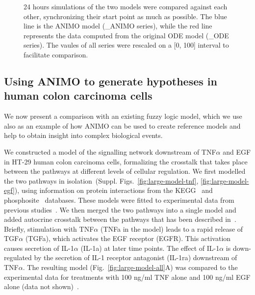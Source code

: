 \documentclass{bmcart}
\begin{document}
\begin{figure}[!htpb]
\begin{center}
\end{center}
\caption{\label{fig:grafici-drosophila-smaller} 24 hours simulations of the two models were compared
against each other, synchronizing their start point as much as possible. The blue line is the ANIMO model
({\sf \_{}ANIMO} series), while the red line represents the data computed from the original ODE model
({\sf \_{}ODE} series). The vaules of all series were rescaled on a [0, 100] interval to facilitate comparison.}
\end{figure}







\subsection*{Using ANIMO to generate hypotheses in human colon carcinoma cells}\label{subsec:case-study-larger}
We now present a comparison with an existing fuzzy logic model, which we use also as an example of how
ANIMO can be used to create reference models and help to obtain insight into complex biological events.

We constructed a model of the signalling network downstream of TNF$\alpha$ and EGF
in HT-29 human colon carcinoma cells, formalizing
the crosstalk that takes place between the pathways at different levels of cellular regulation.
We first modelled the two pathways in isolation~(Suppl. Figs.~\ref{fig:large-model-tnf}, \ref{fig:large-model-egf}),
using information on protein interactions from
the KEGG~\cite{kegg} and phosphosite~\cite{phosphosite} databases. These models were fitted to experimental data
from previous studies~\cite{pathway-compendium,pathway-autocrine}.
We then merged the two pathways into a single model and added autocrine crosstalk between the pathways that has been
described in~\cite{pathway-autocrine}.
Briefly, stimulation with TNF$\alpha$ ({\sf TNFa} in the model) leads to a rapid release of TGF$\alpha$ ({\sf TGFa}),
which activates the EGF receptor ({\sf EGFR}).
This activation causes secretion of IL-1$\alpha$ ({\sf IL-1a}) at later time points.
The effect of IL-1$\alpha$ is down-regulated by the secretion of IL-1 receptor antagonist ({\sf IL-1ra})
downstream of TNF$\alpha$.
The resulting model (Fig.~\ref{fig:large-model-all}A) was compared to the experimental data
for treatments with 100 ng/ml TNF alone and 100 ng/ml EGF alone (data not shown)~\cite{pathway-compendium}.
\end{document}
